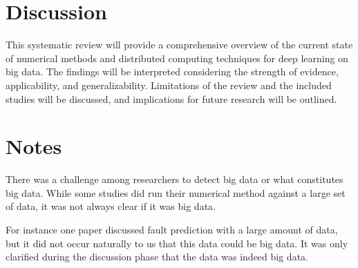 \documentclass[a4paper,12pt]{article}
\begin{document}
\section{Discussion}
This systematic review will provide a comprehensive overview of the current state of numerical methods and distributed computing techniques for deep learning on big data. The findings will be interpreted considering the strength of evidence, applicability, and generalizability. Limitations of the review and the included studies will be discussed, and implications for future research will be outlined.


\section{Notes}

There was a challenge among researchers to detect big data or what constitutes big data. While some studies did run their numerical method against a large set of data, it was not always clear if it was big data.

For instance one paper discussed fault prediction with a large amount of data, but it did not occur naturally to us that this data could be big data. It was only clarified during the discussion phase that the data was indeed big data.



\end{document}
